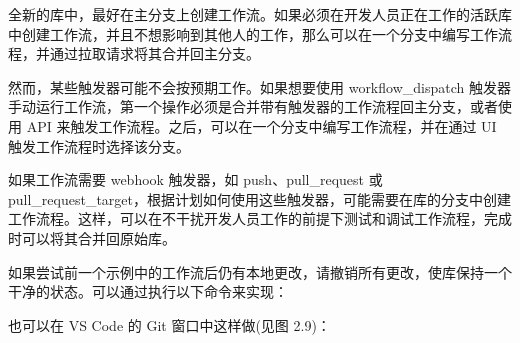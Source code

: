 
全新的库中，最好在主分支上创建工作流。如果必须在开发人员正在工作的活跃库中创建工作流，并且不想影响到其他人的工作，那么可以在一个分支中编写工作流程，并通过拉取请求将其合并回主分支。

然而，某些触发器可能不会按预期工作。如果想要使用 workflow\_dispatch 触发器手动运行工作流，第一个操作必须是合并带有触发器的工作流程回主分支，或者使用 API 来触发工作流程。之后，可以在一个分支中编写工作流程，并在通过 UI 触发工作流程时选择该分支。

如果工作流需要 webhook 触发器，如 push、pull\_request 或 pull\_request\_target，根据计划如何使用这些触发器，可能需要在库的分支中创建工作流程。这样，可以在不干扰开发人员工作的前提下测试和调试工作流程，完成时可以将其合并回原始库。


如果尝试前一个示例中的工作流后仍有本地更改，请撤销所有更改，使库保持一个干净的状态。可以通过执行以下命令来实现：


也可以在 VS Code 的 Git 窗口中这样做(见图 2.9)：




